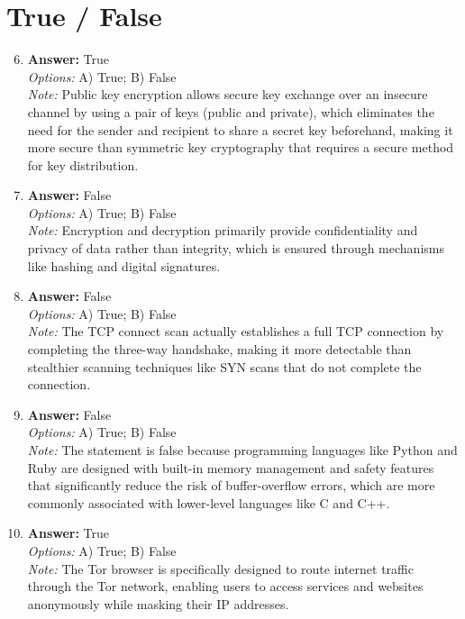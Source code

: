 \documentclass[12pt]{article}
\begin{document}
\section*{True / False}
\begin{enumerate}[label=\arabic*.]
\setcounter{enumi}{5}
\item \textbf{Answer:} True
\\ \textit{Options:} A) True; B) False
\\ \textit{Note:} Public key encryption allows secure key exchange over an insecure channel by using a pair of keys (public and private), which eliminates the need for the sender and recipient to share a secret key beforehand, making it more secure than symmetric key cryptography that requires a secure method for key distribution.
\item \textbf{Answer:} False
\\ \textit{Options:} A) True; B) False
\\ \textit{Note:} Encryption and decryption primarily provide confidentiality and privacy of data rather than integrity, which is ensured through mechanisms like hashing and digital signatures.
\item \textbf{Answer:} False
\\ \textit{Options:} A) True; B) False
\\ \textit{Note:} The TCP connect scan actually establishes a full TCP connection by completing the three-way handshake, making it more detectable than stealthier scanning techniques like SYN scans that do not complete the connection.
\item \textbf{Answer:} False
\\ \textit{Options:} A) True; B) False
\\ \textit{Note:} The statement is false because programming languages like Python and Ruby are designed with built-in memory management and safety features that significantly reduce the risk of buffer-overflow errors, which are more commonly associated with lower-level languages like C and C++.
\item \textbf{Answer:} True
\\ \textit{Options:} A) True; B) False
\\ \textit{Note:} The Tor browser is specifically designed to route internet traffic through the Tor network, enabling users to access services and websites anonymously while masking their IP addresses.
\end{enumerate}
\end{document}
